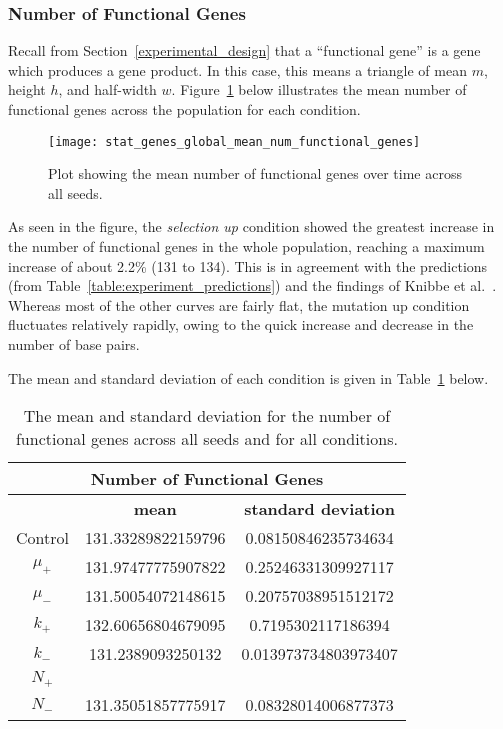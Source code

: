 \subsubsection{Number of Functional Genes}\label{sec:number_of_functional_genes}
Recall from Section~\ref{experimental_design} that a ``functional gene'' is a gene which produces a gene product. In this case, this means a triangle of mean $m$, height $h$, and half-width $w$. Figure~\ref{fig:mean_num_functional_genes} below illustrates the mean number of functional genes across the population for each condition.  
\begin{figure}[H]
	\centering
	\texttt{[image: stat\_genes\_global\_mean\_num\_functional\_genes]}
	\caption[Mean number of functional genes]{Plot showing the mean number of functional genes over time across all seeds.}
	\label{fig:mean_num_functional_genes}
\end{figure}
As seen in the figure, the \textit{selection up} condition showed the greatest increase in the number of functional genes in the whole population, reaching a maximum increase of about 2.2\% (131 to 134). This is in agreement with the predictions (from Table~\ref{table:experiment_predictions}) and the findings of Knibbe et al.~\cite{Knibbe2007}. Whereas most of the other curves are fairly flat, the mutation up condition fluctuates relatively rapidly, owing to the quick increase and decrease in the number of base pairs. 

The mean and standard deviation of each condition is given in Table~\ref{table:number_of_genes_mean_std_dev} below.

\begin{table}[H]
	\centering
	\begin{tabular}{|c|c|c|}
		\hline
		\multicolumn{3}{c}{\Large \textbf{Number of Functional Genes}} \\
		\hline
		& \textbf{mean} & \textbf{standard deviation} \\
		\hline
		Control & 131.33289822159796 & 0.08150846235734634 \\
		\hline
		$\mu_+$ & 131.97477775907822 & 0.25246331309927117 \\
		\hline
		$\mu_-$ & 131.50054072148615 & 0.20757038951512172 \\
		\hline
		$k_+$ & 132.60656804679095 & 0.7195302117186394 \\ 
		\hline
		$k_-$ & 131.2389093250132 & 0.013973734803973407 \\
		\hline
		$N_+$ & & \\
		\hline
		$N_-$ & 131.35051857775917 & 0.08328014006877373 \\
		\hline
	\end{tabular}
	\caption[Number of functional genes - mean and standard deviation]{The mean and standard deviation for the number of functional genes across all seeds and for all conditions.}
	\label{table:number_of_genes_mean_std_dev}
\end{table}
